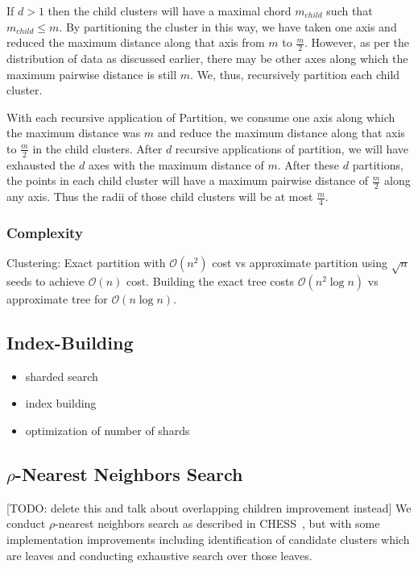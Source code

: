 If $d > 1$ then the child clusters will have a maximal chord $m_{child}$ such that $m_{child} \leq m$.
By partitioning the cluster in this way, we have taken one axis and reduced the maximum distance along that axis from $m$ to $\frac{m}{2}$.
However, as per the distribution of data as discussed earlier, there may be other axes along which the maximum pairwise distance is still $m$.
We, thus, recursively partition each child cluster.

With each recursive application of Partition, we consume one axis along which the maximum distance was $m$ and reduce the maximum distance along that axis to $\frac{m}{2}$ in the child clusters.
After $d$ recursive applications of partition, we will have exhausted the $d$ axes with the maximum distance of $m$.
After these $d$ partitions, the points in each child cluster will have a maximum pairwise distance of $\frac{m}{2}$ along any axis.
Thus the radii of those child clusters will be at most $\frac{m}{4}$.

\subsubsection {Complexity}
\label{subsubsec:methods:clustering:complexity}

Clustering: Exact partition with $\mathcal{O}(n^2)$ cost vs approximate partition using $\sqrt{n}$ seeds to achieve $\mathcal{O}(n)$ cost.
Building the exact tree costs $\mathcal{O}(n^2 \log n)$ vs approximate tree for $\mathcal{O}(n \log n)$.


\subsection {Index-Building}
\begin{itemize}
    \item sharded search
    \item index building 
    \item optimization of number of shards 
\end{itemize}

\subsection{\texorpdfstring{$\rho$}{p}-Nearest Neighbors Search}
\label{subsec:methods:rnn-search}


[TODO: delete this and talk about overlapping children improvement instead]
We conduct $\rho$-nearest neighbors search as described in CHESS~\cite{ishaq2019clustered}, but 
with some implementation improvements including identification of candidate clusters which are leaves and 
conducting exhaustive search over those leaves.

